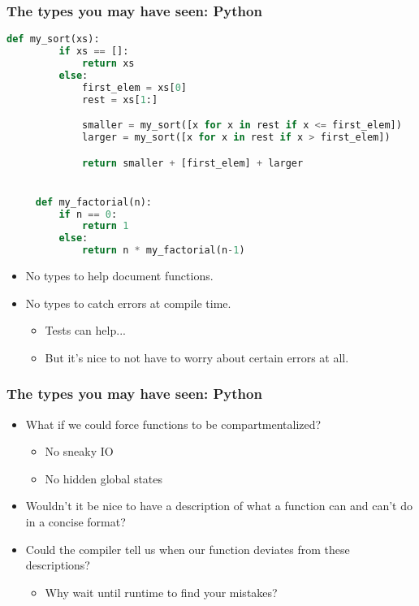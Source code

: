 \documentclass{beamer}
\begin{document}
\begin{frame}[fragile]
  \frametitle{The types you may have seen: Python}
  \begin{lstlisting}[frame=single, language=Python, breaklines=true, basicstyle=\ttfamily\tiny]
     def my_sort(xs):
         if xs == []:
             return xs
         else:
             first_elem = xs[0]
             rest = xs[1:]

             smaller = my_sort([x for x in rest if x <= first_elem])
             larger = my_sort([x for x in rest if x > first_elem])

             return smaller + [first_elem] + larger


     def my_factorial(n):
         if n == 0:
             return 1
         else:
             return n * my_factorial(n-1)
  \end{lstlisting}

  \begin{itemize}
  \item No types to help document functions.

  \item No types to catch errors at compile time.
    \begin{itemize}
    \item Tests can help...
    \item But it's nice to not have to worry about certain errors at all.
    \end{itemize}
  \end{itemize}
\end{frame}

\begin{frame}
  \frametitle{The types you may have seen: Python}

  \begin{itemize}
  \item What if we could force functions to be compartmentalized?
    \begin{itemize}
    \item No sneaky IO
    \item No hidden global states
    \end{itemize}
    
  \pause
  \item Wouldn't it be nice to have a description of what a function can and can't do in a concise format?

  \pause
  \item Could the compiler tell us when our function deviates from these descriptions?
    \begin{itemize}
    \item Why wait until runtime to find your mistakes?
    \end{itemize}

  \end{itemize}
\end{frame}
\end{document}

